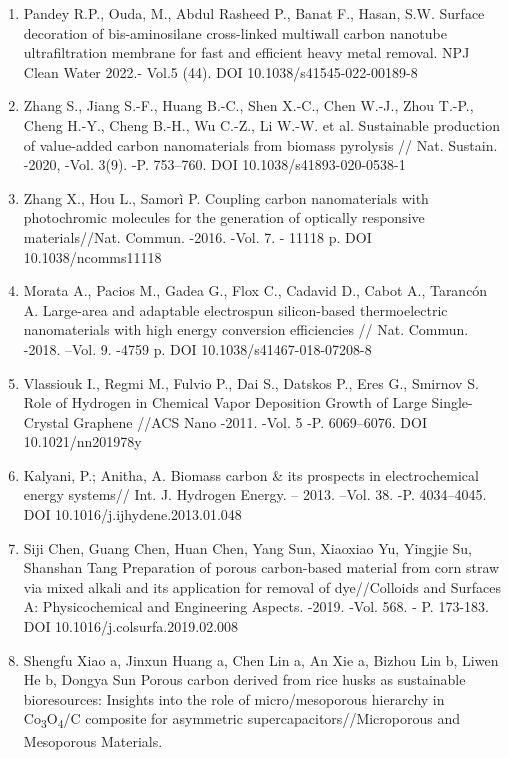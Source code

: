 \begin{enumerate}
\def\labelenumi{\arabic{enumi}.}
\item
  Pandey R.P., Ouda, M., Abdul Rasheed P., Banat F., Hasan, S.W. Surface
  decoration of bis-aminosilane cross-linked multiwall carbon nanotube
  ultrafiltration membrane for fast and efficient heavy metal removal.
  NPJ Clean Water 2022.- Vol.5 (44). DOI 10.1038/s41545-022-00189-8
\item
  Zhang S., Jiang S.-F., Huang B.-C., Shen X.-C., Chen W.-J., Zhou
  T.-P., Cheng H.-Y., Cheng B.-H., Wu C.-Z., Li W.-W. et al. Sustainable
  production of value-added carbon nanomaterials from biomass pyrolysis
  // Nat. Sustain. -2020, -Vol. 3(9). -P. 753--760. DOI
  10.1038/s41893-020-0538-1
\item
  Zhang X., Hou L., Samorì P. Coupling carbon nanomaterials with
  photochromic molecules for the generation of optically responsive
  materials//Nat. Commun. -2016. -Vol. 7. - 11118 p. DOI
  10.1038/ncomms11118
\item
  Morata A., Pacios M., Gadea G., Flox C., Cadavid D., Cabot A.,
  Tarancón A. Large-area and adaptable electrospun silicon-based
  thermoelectric nanomaterials with high energy conversion efficiencies
  // Nat. Commun. -2018. --Vol. 9. -4759 p. DOI
  10.1038/s41467-018-07208-8
\item
  Vlassiouk I., Regmi M., Fulvio P., Dai S., Datskos P., Eres G.,
  Smirnov S. Role of Hydrogen in Chemical Vapor Deposition Growth of
  Large Single-Crystal Graphene //ACS Nano -2011. -Vol. 5 -P.
  6069--6076. DOI 10.1021/nn201978y
\item
  Kalyani, P.; Anitha, A. Biomass carbon \& its prospects in
  electrochemical energy systems// Int. J. Hydrogen Energy. -- 2013.
  --Vol. 38. -P. 4034--4045. DOI 10.1016/j.ijhydene.2013.01.048
\item
  Siji Chen, Guang Chen, Huan Chen, Yang Sun, Xiaoxiao Yu, Yingjie Su,
  Shanshan Tang Preparation of porous carbon-based material from corn
  straw via mixed alkali and its application for removal of
  dye//Colloids and Surfaces A: Physicochemical and Engineering Aspects.
  -2019. -Vol. 568. - P. 173-183. DOI 10.1016/j.colsurfa.2019.02.008
\item
  Shengfu Xiao a, Jinxun Huang a, Chen Lin a, An Xie a, Bizhou Lin b,
  Liwen He b, Dongya Sun Porous carbon derived from rice husks as
  sustainable bioresources: Insights into the role of micro/mesoporous
  hierarchy in Co\textsubscript{3}O\textsubscript{4}/C composite for
  asymmetric supercapacitors//Microporous and Mesoporous Materials.

\end{enumerate}
